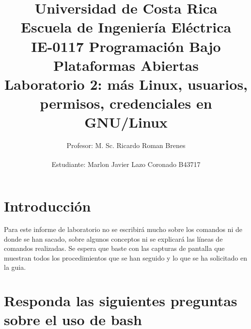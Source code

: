 \documentclass{article}
\title{Universidad de Costa Rica \\ \vspace{0.5cm}
Escuela de Ingeniería Eléctrica\\ \vspace{2cm}
IE-0117 Programación Bajo Plataformas Abiertas\\
Laboratorio 2: más Linux, usuarios, permisos, credenciales en GNU/Linux\\ \vspace{2cm}
}
\author{Profesor: M. Sc. Ricardo Roman Brenes
\\\\
Estudiante: Marlon Javier Lazo Coronado B43717\\ \vspace{1cm}}\\
\begin{document}
\maketitle


\newpage
\tableofcontents
\listoffigures
\newpage
\newpage

\section{Introducción}

Para este informe de laboratorio no se escribirá mucho sobre los comandos ni de donde se han sacado, sobre algunos conceptos ni se explicará las líneas de comandos realizadas. Se espera que baste con las capturas de pantalla que muestran todos los procedimientos que se han seguido y lo que se ha solicitado en la guia.




\section{Responda las siguientes preguntas sobre el uso de bash}
\end{document}
